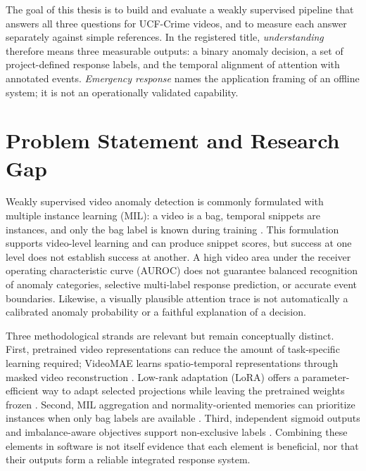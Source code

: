 The goal of this thesis is to build and evaluate a weakly supervised pipeline
that answers all three questions for UCF-Crime videos, and to measure each
answer separately against simple references. In the registered title,
\emph{understanding} therefore means three measurable outputs: a binary anomaly
decision, a set of project-defined response labels, and the temporal alignment
of attention with annotated events. \emph{Emergency response} names the
application framing of an offline system; it is not an operationally validated
capability.

\section{Problem Statement and Research Gap}
\label{sec:introduction-gap}

Weakly supervised video anomaly detection is commonly formulated with multiple
instance learning (MIL): a video is a bag, temporal snippets are instances, and
only the bag label is known during training \cite{sultani2018real,tian2021weakly}.
This formulation supports video-level learning and can produce snippet scores,
but success at one level does not establish success at another. A high video
area under the receiver operating characteristic curve (AUROC) does not
guarantee balanced recognition of anomaly categories, selective
multi-label response prediction, or accurate event boundaries. Likewise, a
visually plausible attention trace is not automatically a calibrated anomaly
probability or a faithful explanation of a decision.

Three methodological strands are relevant but remain conceptually distinct.
First, pretrained video representations can reduce the amount of task-specific
learning required; VideoMAE learns spatio-temporal representations through
masked video reconstruction \cite{tong2022videomae}. Low-rank adaptation (LoRA)
offers a parameter-efficient way to adapt selected projections while leaving the
pretrained weights frozen \cite{hu2021lora}. Second, MIL aggregation and
normality-oriented memories can prioritize instances when only bag labels are
available \cite{ilse2018attention,zhou2023ur}. Third, independent sigmoid outputs
and imbalance-aware objectives support non-exclusive labels
\cite{boutell2004learning,ridnik2021asymmetric}. Combining these elements in
software is not itself evidence that each element is beneficial, nor that their
outputs form a reliable integrated response system.

